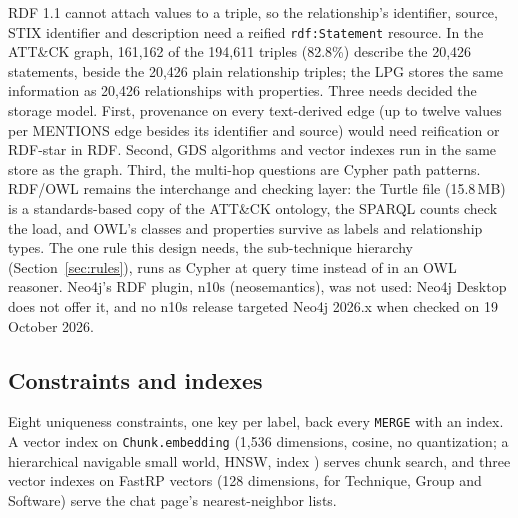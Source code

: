 \documentclass[conference,letterpaper]{IEEEtran}
\newcommand{\code}[1]{\texttt{#1}}
\begin{document}
RDF 1.1 cannot attach values to a triple, so the relationship's identifier, source, STIX identifier and description need a reified \code{rdf:Statement} resource. In the ATT\&CK graph, 161,162 of the 194,611 triples (82.8\%) describe the 20,426 statements, beside the 20,426 plain relationship triples; the LPG stores the same information as 20,426 relationships with properties. Three needs decided the storage model. First, provenance on every text-derived edge (up to twelve values per MENTIONS edge besides its identifier and source) would need reification or RDF-star in RDF. Second, GDS algorithms and vector indexes run in the same store as the graph. Third, the multi-hop questions are Cypher path patterns. RDF/OWL remains the interchange and checking layer: the Turtle file (15.8\,MB) is a standards-based copy of the ATT\&CK ontology, the SPARQL counts check the load, and OWL's classes and properties survive as labels and relationship types. The one rule this design needs, the sub-technique hierarchy (Section~\ref{sec:rules}), runs as Cypher at query time instead of in an OWL reasoner. Neo4j's RDF plugin, n10s (neosemantics), was not used: Neo4j Desktop does not offer it, and no n10s release targeted Neo4j 2026.x when checked on 19 October 2026.

\subsection{Constraints and indexes}
Eight uniqueness constraints, one key per label, back every \code{MERGE} with an index. A vector index on \code{Chunk.embedding} (1,536 dimensions, cosine, no quantization; a hierarchical navigable small world, HNSW, index \cite{malkov2020}) serves chunk search, and three vector indexes on FastRP vectors (128 dimensions, for Technique, Group and Software) serve the chat page's nearest-neighbor lists.

\end{document}
